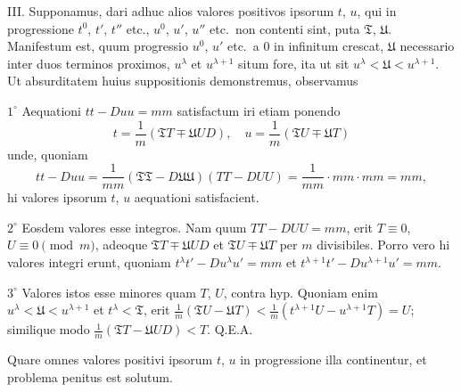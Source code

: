 \documentclass[12pt,a4paper]{article}
\theoremstyle{plain}
\begin{document}
III. Supponamus, dari adhuc alios valores positivos ipsorum $t$, $u$, qui in progressione $t^0$, $t'$, $t''$ etc., $u^0$, $u'$, $u''$ etc.~non contenti sint, puta $\mathfrak{T}$, $\mathfrak{U}$. Manifestum est, quum progressio $u^0$, $u'$ etc.~a $0$ in infinitum crescat, $\mathfrak{U}$ necessario inter duos terminos proximos, $u^\lambda$ et $u^{\lambda+1}$ situm fore, ita ut sit $u^\lambda < \mathfrak{U} < u^{\lambda+1}$. Ut absurditatem huius suppositionis demonstremus, observamus

$1^\circ$ Aequationi $tt - Duu = mm$ satisfactum iri etiam ponendo
\[
t = \frac{1}{m}(\mathfrak{T}T \mp \mathfrak{U}UD), \quad u = \frac{1}{m}(\mathfrak{T}U \mp \mathfrak{U}T)
\]
unde, quoniam
\[
tt - Duu = \frac{1}{mm}(\mathfrak{T}\mathfrak{T} - D\mathfrak{U}\mathfrak{U})(TT - DUU) = \frac{1}{mm} \cdot mm \cdot mm = mm,
\]
hi valores ipsorum $t$, $u$ aequationi satisfacient.

$2^\circ$ Eosdem valores esse integros. Nam quum $TT - DUU = mm$, erit $T \equiv 0$, $U \equiv 0 \pmod{m}$, adeoque $\mathfrak{T}T \mp \mathfrak{U}UD$ et $\mathfrak{T}U \mp \mathfrak{U}T$ per $m$ divisibiles. Porro vero hi valores integri erunt, quoniam $t^\lambda t' - Du^\lambda u' = mm$ et $t^{\lambda+1}t' - Du^{\lambda+1}u' = mm$.

$3^\circ$ Valores istos esse minores quam $T$, $U$, contra hyp. Quoniam enim $u^\lambda < \mathfrak{U} < u^{\lambda+1}$ et $t^\lambda < \mathfrak{T}$, erit $\frac{1}{m}(\mathfrak{T}U - \mathfrak{U}T) < \frac{1}{m}(t^{\lambda+1}U - u^{\lambda+1}T) = U$; similique modo $\frac{1}{m}(\mathfrak{T}T - \mathfrak{U}UD) < T$. Q.E.A.

Quare omnes valores positivi ipsorum $t$, $u$ in progressione illa continentur, et problema penitus est solutum.
\end{document}
